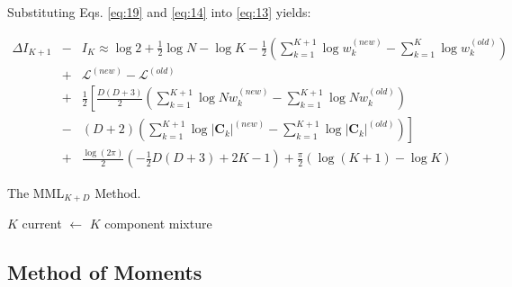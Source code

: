 \documentclass{elsarticle}
\newcommand{\nbb}[2]{
    \fcolorbox{black}{cyan}{\bfseries\sffamily\scriptsize#1}
    {\sf$\blacktriangleright$\textcolor{blue}{\textit{#2}}$\blacktriangleleft$}
}
\newcommand{\alda}[1]{\nbb{Aldeida}{#1}}
\newcommand{\vect}[1]{\boldsymbol{\mathbf{#1}}}
\def\cov{C}
\def\veccov{\vect{\cov}}
\begin{document}
\noindent{}Substituting Eqs. \ref{eq:19} and \ref{eq:14} into \ref{eq:13} yields:

\begin{eqnarray}
\Delta{}I_{K+1} &-& I_K \approx \log{2} %
    + \frac{1}{2}\log{N} - \log{K} - \frac{1}{2}\left(\sum_{k=1}^{K+1}\log{w_k^{(new)}} - \sum_{k=1}^{K}\log{w_k^{(old)}}\right) \nonumber \\ %
& +& \mathcal{L}^{(new)} - \mathcal{L}^{(old)} \nonumber \\ %
& +& \frac{1}{2}\left[\frac{D(D+3)}{2}\left(\sum_{k=1}^{K+1}\log{Nw_k^{(new)} - \sum_{k=1}^{K+1}\log{Nw_k^{(old)}}} \right) \right.\nonumber \\
&-& \left.\left(D+2\right)\left(\sum_{k=1}^{K+1}\log{|\veccov_k|^{(new)}} - \sum_{k=1}^{K+1}\log{|\veccov_k|^{(old)}}\right)\right] \nonumber \\
& +& \frac{\log(2\pi)}{2}(-\frac{1}{2}D(D+3) + 2K  - 1) + \frac{\pi}{2}\left(\log{(K + 1)} - \log{K}\right)
\end{eqnarray}

\begin{algorithm}[H]
\caption{The MML$_{K+D}$ Method.}
\label{alg:MMLKD}
\begin{algorithmic}[1]
 $K$ 
\State current $\leftarrow$ $K$ component mixture
\EndWhile
{} 
\end{algorithmic}
\end{algorithm}

\subsection{Method of Moments}
%
%
%
%
%
%
\end{document}
